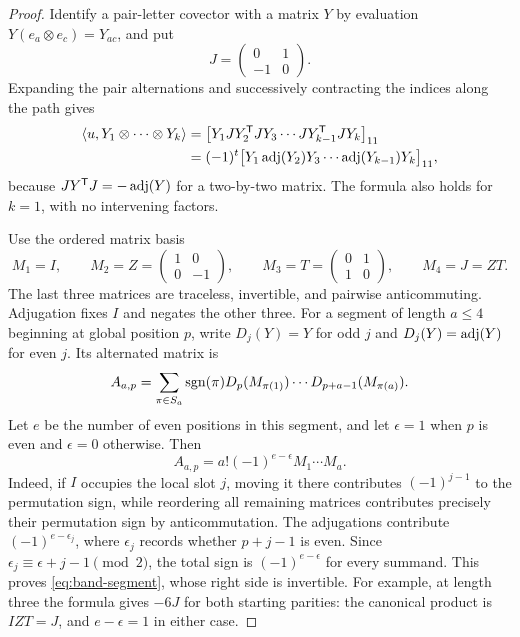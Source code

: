 \begin{proof}
Identify a pair-letter covector with a matrix $Y$ by evaluation
$Y(e_a\otimes e_c)=Y_{ac}$, and put
\[
 J=\begin{pmatrix}0&1\\-1&0\end{pmatrix}.
\]
Expanding the pair alternations and successively contracting the
indices along the path gives
\begin{align}
 \langle u,Y_1\otimes\cdots\otimes Y_k\rangle
 &=\bigl[Y_1JY_2^{\mathsf T}JY_3\cdots
                 JY_{k-1}^{\mathsf T}JY_k\bigr]_{11}\notag\\
 &=(-1)^t
   \bigl[Y_1\operatorname{adj}(Y_2)Y_3\cdots\operatorname{adj}(Y_{k-1})Y_k\bigr]_{11},
 \label{eq:band-path-contraction}
\end{align}
because $JY^{\mathsf T}J=-\operatorname{adj}(Y)$ for a two-by-two matrix.
The formula also holds for $k=1$, with no intervening factors.

Use the ordered matrix basis
\[
 M_1=I,\qquad
 M_2=Z=\begin{pmatrix}1&0\\0&-1\end{pmatrix},\qquad
 M_3=T=\begin{pmatrix}0&1\\1&0\end{pmatrix},\qquad M_4=J=ZT.
\]
The last three matrices are traceless, invertible, and pairwise
anticommuting.  Adjugation fixes $I$ and negates the other three.
For a segment of length $a\le4$ beginning at global position $p$,
write $D_j(Y)=Y$ for odd $j$ and $D_j(Y)=\operatorname{adj}(Y)$ for even $j$.
Its alternated matrix is
\[
 A_{a,p}=\sum_{\pi\in S_a}\operatorname{sgn}(\pi)
       D_p(M_{\pi(1)})\cdots D_{p+a-1}(M_{\pi(a)}).
\]
Let $e$ be the number of even positions in this segment, and let
$\epsilon=1$ when $p$ is even and $\epsilon=0$ otherwise.  Then
\begin{equation}\label{eq:band-segment}
 A_{a,p}=a!(-1)^{e-\epsilon}M_1\cdots M_a.
\end{equation}
Indeed, if $I$ occupies the local slot $j$, moving it there
contributes $(-1)^{j-1}$ to the permutation sign, while reordering
all remaining matrices contributes precisely their permutation
sign by anticommutation.  The adjugations contribute
$(-1)^{e-\epsilon_j}$, where $\epsilon_j$ records whether
$p+j-1$ is even.  Since
$\epsilon_j\equiv\epsilon+j-1\pmod2$, the total sign is
$(-1)^{e-\epsilon}$ for every summand.  This proves
\eqref{eq:band-segment}, whose right side is invertible.
For example, at length three the formula gives $-6J$ for both
starting parities: the canonical product is $IZT=J$, and
$e-\epsilon=1$ in either case.


\end{proof}
